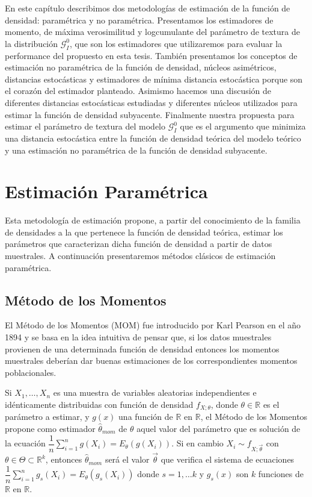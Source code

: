 En este capítulo describimos dos metodologías de estimación de la función de densidad: paramétrica y no paramétrica. Presentamos los estimadores de momento, de máxima verosimilitud y logcumulante del parámetro de textura de la distribución $\mathcal{G}_I^0$, que son los estimadores que utilizaremos para evaluar la performance del propuesto en esta tesis. También presentamos los conceptos de estimación no paramétrica de la función de densidad, núcleos asimétricos, distancias estocásticas y estimadores de mínima distancia estocástica porque son el corazón del estimador planteado.  Asimismo hacemos una discusión de diferentes distancias estocásticas estudiadas y diferentes núcleos utilizados para estimar la función de densidad subyacente. Finalmente nuestra propuesta para estimar el parámetro de textura del modelo $\mathcal{G}_I^0$ que es el argumento que minimiza una distancia estocástica entre la función de densidad teórica del modelo teórico y una estimación no paramétrica de la función de densidad subyacente. 


\section{Estimación Paramétrica}
\label{EstimacionParamétrica}

Esta metodología de estimación propone, a partir del conocimiento de la familia de densidades a la que pertenece la función de densidad teórica, estimar los parámetros que caracterizan dicha función de densidad a partir de datos muestrales. A continuación presentaremos métodos clásicos de estimación paramétrica.

\subsection{Método de los Momentos}
El Método de los Momentos (MOM) fue introducido por Karl Pearson en el año 1894 y se basa en la idea intuitiva de pensar que, si los datos muestrales provienen de una determinada función de densidad entonces los momentos muestrales deberían dar buenas estimaciones de los correspondientes momentos poblacionales. 

\begin{definition}
Si $X_1, \ldots, X_n$ es una muestra de variables aleatorias independientes e idénticamente distribuidas con función de densidad $f_{X;\theta}$, donde $\theta \in \mathbb{R}$ es el parámetro a estimar, y $g(x)$ una función de $\mathbb{R}$ en $\mathbb{R}$, el Método de los Momentos propone como estimador $\hat{\theta}_{mom}$ de $\theta$ aquel valor del parámetro que es solución de la ecuación  $\dfrac{1}{n} \sum_{i=1}^n g(X_i)=E_{\theta}(g(X_i)).$  
Si en cambio $X_i \sim f_{X;\vec{\theta}}$ con $\theta \in \Theta \subset \mathbb{R}^k$, entonces $\hat{\theta}_{mom}$ será el valor $\vec{\theta}$ que verifica el sistema de ecuaciones $\dfrac{1}{n} \sum_{i=1}^n g_s(X_i)=E_{\theta}(g_s(X_i))$ donde $s=1, \ldots k$ y $g_s(x)$ son $k$ funciones de $\mathbb{R}$ en $\mathbb{R}$.
\end{definition}


